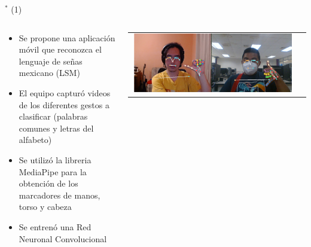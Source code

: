 
\begin{frame}{$^*$  (1)}
\begin{columns}
\begin{column}{0.6\textwidth}
	\begin{itemize}
		\item Se propone una aplicación móvil que reconozca el lenguaje de señas mexicano (LSM)
        \item El equipo capturó videos de los diferentes gestos a clasificar (palabras comunes y letras del alfabeto)
        \item Se utilizó la libreria MediaPipe para la obtención de los marcadores de manos, torso y cabeza
        \item Se entrenó una Red Neuronal Convolucional
	\end{itemize}
\end{column}
\begin{column}{0.4\textwidth}  
\begin{center}
     \begin{tabular}{cc}

         \includegraphics[width=0.98\textwidth]{2022_AplicacionLSM/figs/Diapositiva1.PNG}\\         
      \end{tabular}
\end{center}
\end{column} 
\end{columns} 
\end{frame}


